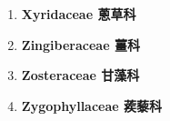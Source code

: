 \begin{enumerate}
        
      \item[] \begin{small}\textbf{Xyridaceae 蔥草科} \end{small}
        
      \item[] \begin{small}\textbf{Zingiberaceae 薑科} \end{small}
        
      \item[] \begin{small}\textbf{Zosteraceae 甘藻科} \end{small}
        
      \item[] \begin{small}\textbf{Zygophyllaceae 蒺藜科} \end{small}
        
    \end{enumerate}
